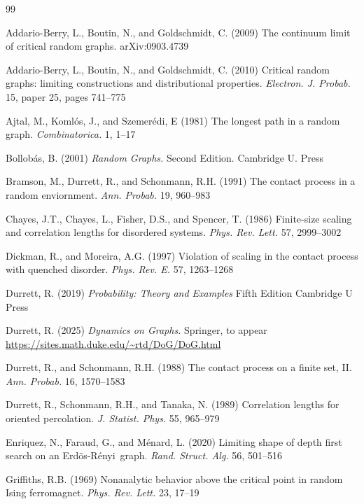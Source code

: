\documentclass[11pt]{article}
\theoremstyle{definition}
\def\ER{Erd\"os-R\'enyi\ }
\begin{document}
\begin{thebibliography}{99}

\frenchspacing

Addario-Berry, L., Boutin, N., and Goldschmidt, C. (2009)
The continuum limit of critical random graphs.
arXiv:0903.4739


Addario-Berry, L., Boutin, N., and Goldschmidt, C. (2010)
 Critical random graphs: limiting constructions and distributional properties.
{\it Electron. J. Probab.} 15, paper 25, pages 741--775

Ajtal, M., Koml\'os, J., and Szemer\'edi, E (1981)
The longest path in a random graph.
{\it Combinatorica.} 1, 1--17


Bollob\'as, B. (2001)
{\it Random Graphs.} Second Edition.
Cambridge U. Press

Bramson, M., Durrett, R., and Schonmann, R.H. (1991)
The contact process in a random enviornment.
{\it Ann. Probab.} 19, 960--983


Chayes, J.T., Chayes, L., Fisher, D.S., and Spencer, T. (1986)
Finite-size scaling and correlation lengths for disordered systems.
{\it Phys. Rev. Lett.} 57, 2999--3002

Dickman, R., and Moreira, A.G. (1997)
Violation of scaling in the contact process with quenched disorder.
{\it Phys. Rev. E.} 57, 1263--1268



Durrett, R. (2019)
{\it Probability: Theory and Examples}
Fifth Edition Cambridge U Press

Durrett, R. (2025)
{\it Dynamics on Graphs.}
Springer, to appear
\url{https://sites.math.duke.edu/~rtd/DoG/DoG.html}


Durrett, R., and Schonmann, R.H. (1988)
The contact process on a finite set, II.
{\it Ann. Probab.} 16, 1570--1583


Durrett, R., Schonmann, R.H., and Tanaka, N.  (1989)
Correlation lengths for oriented percolation.
{\it J. Statist. Phys.} 55, 965--979


Enriquez, N., Faraud, G., and M\'enard, L. (2020)
Limiting shape of depth first search on an \ER graph.
{\it Rand. Struct. Alg.} 56, 501--516

Griffiths, R.B. (1969)
Nonanalytic behavior above the critical point in random Ising ferromagnet.
{\it Phys. Rev. Lett.} 23, 17--19



\end{thebibliography}
\end{document}
